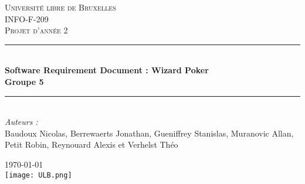 \documentclass{article}
\begin{document}

\begin{titlepage}

\newcommand{\HRule}{\rule{\linewidth}{0.5mm}} %

\center %


\textsc{\LARGE Université libre de Bruxelles}\\[1.5cm]
\textsc{\Large INFO-F-209}\\[0.5cm]
\textsc{\large Projet d'année 2}\\[0.5cm]


\HRule \\[0.4cm]
{ \huge \bfseries Software Requirement Document : Wizard Poker \\ Groupe 5}\\[0.4cm]
\HRule \\[1.5cm]


\Large \emph{Auteurs :}\\
Baudoux Nicolas, Berrewaerts Jonathan, Gueniffrey Stanislas,  Muranovic Allan, Petit Robin, Reynouard Alexis et Verhelst Théo


{\large \today}\\[2cm]


\texttt{[image: ULB.png]}\\[1cm]


\vfill

\end{titlepage}
\end{document}
